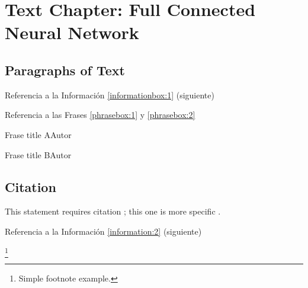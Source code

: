\chapter{Text Chapter: Full Connected Neural Network}

\section{Paragraphs of Text}

\lipsum[1][1-3] 

Referencia a la Información \ref{informationbox:1} (siguiente)

\begin{informationbox}[Título A]
\label{informationbox:1}
\lipsum[1][1-3] 
\end{informationbox}

\lipsum[1][1-3]


Referencia a las Frases \ref{phrasebox:1} y \ref{phrasebox:2} 

\begin{phrasebox}{Frase title A}{Autor}
\label{phrasebox:1}
\lipsum[1][1-3] 
\end{phrasebox}

\lipsum[1] 

\begin{phrasebox}{Frase title B}{Autor}
\label{phrasebox:2}
\lipsum[1][1-3] 
\end{phrasebox}

\lipsum[1][1-3] 

\begin{citationbox}
\lipsum[1][1-3] 
\end{citationbox}

\section{Citation}

This statement requires citation \cite{book_key}; this one is more specific \cite[122]{article_key}.

\lipsum[1] %

Referencia a la Información \ref{information:2} (siguiente)

\begin{informationbox}[Título B]
\label{information:2}
\lipsum[1][1-3]\footnote{Simple footnote example.}
\end{informationbox}

